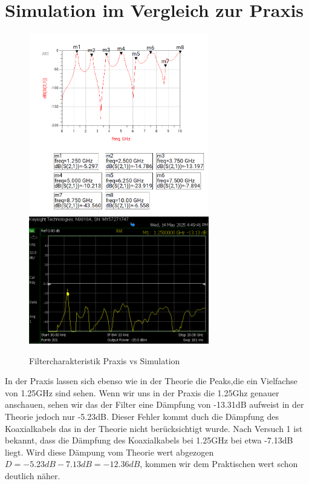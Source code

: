     \section{Simulation im Vergleich zur Praxis}
    \begin{figure}[H]
        \includegraphics[width=0.7\textwidth]{Pictures/simulationmitmarkern32.8.png}
        \includegraphics[width=0.7\textwidth]{Pictures/S12neuCooleGrupp.png}
        \centering
        \caption{Filtercharakteristik Praxis vs Simulation}
    \end{figure}
    In der Praxis lassen sich ebenso wie in der Theorie die Peaks,die ein Vielfachse von 1.25GHz sind sehen.
    Wenn wir uns in der Praxis die 1.25Ghz genauer anschauen, sehen wir das der Filter eine Dämpfung von -13.31dB
    aufweist in der Theorie jedoch nur -5.23dB. Dieser Fehler kommt duch die Dämpfung des Koaxialkabels
    das in der Theorie nicht berücksichtigt wurde.
    Nach Versuch 1 ist bekannt, dass die Dämpfung des Koaxialkabels bei 1.25GHz bei etwa -7.13dB liegt.
    Wird diese Dämpung vom Theorie wert abgezogen $D=-5.23dB-7.13dB=-12.36dB$, kommen wir dem Praktischen wert schon deutlich näher.
     




